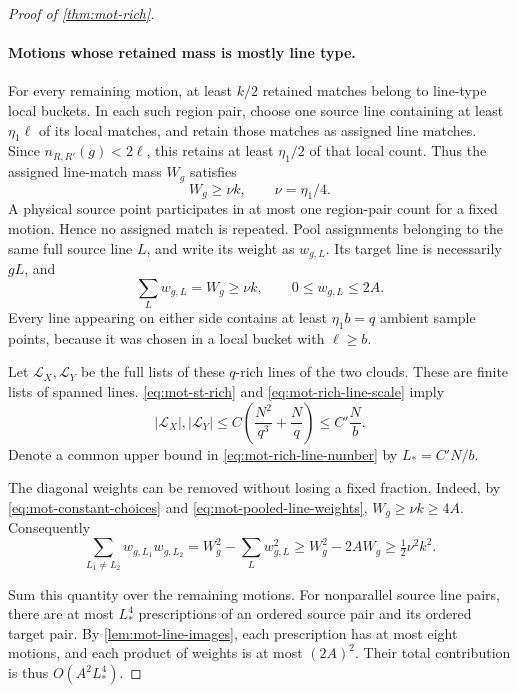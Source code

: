 \begin{proof}[Proof of \cref{thm:mot-rich}]
\paragraph{Motions whose retained mass is mostly line type.}
For every remaining motion, at least $k/2$ retained matches belong to line-type local buckets.  In each such region pair, choose one source line containing at least $\eta_1\ell$ of its local matches, and retain those matches as assigned line matches.  Since $n_{R,R'}(g)<2\ell$, this retains at least $\eta_1/2$ of that local count.  Thus the assigned line-match mass $W_g$ satisfies
\[
 W_g\ge\nu k,\qquad \nu=\eta_1/4.
\]
A physical source point participates in at most one region-pair count for a fixed motion.  Hence no assigned match is repeated. Pool assignments belonging to the same full source line $L$, and write its weight as $w_{g,L}$.  Its target line is necessarily $gL$, and
\begin{equation}
\label{eq:mot-pooled-line-weights}
 \sum_Lw_{g,L}=W_g\ge\nu k,
 \qquad 0\le w_{g,L}\le2A.
\end{equation}
Every line appearing on either side contains at least $\eta_1b=q$ ambient sample points, because it was chosen in a local bucket with $\ell\ge b$.

Let $\mathcal{L}_X,\mathcal{L}_Y$ be the full lists of these $q$-rich lines of the two clouds.  These are finite lists of spanned lines.  \eqref{eq:mot-st-rich} and \eqref{eq:mot-rich-line-scale} imply
\begin{equation}
\label{eq:mot-rich-line-number}
 |\mathcal{L}_X|,|\mathcal{L}_Y|
 \le C\left(\frac{N^2}{q^3}+\frac Nq\right)
 \le C'\frac Nb.
\end{equation}
Denote a common upper bound in \eqref{eq:mot-rich-line-number} by $L_*=C'N/b$.

The diagonal weights can be removed without losing a fixed fraction.  Indeed, by \eqref{eq:mot-constant-choices} and \eqref{eq:mot-pooled-line-weights}, $W_g\ge\nu k\ge4A$.  Consequently
\begin{equation}
\label{eq:mot-distinct-line-pair-mass}
 \sum_{L_1\ne L_2}w_{g,L_1}w_{g,L_2}
 =W_g^2-\sum_Lw_{g,L}^2
 \ge W_g^2-2AW_g
 \ge\tfrac12\nu^2 k^2.
\end{equation}

Sum this quantity over the remaining motions.  For nonparallel source line pairs, there are at most $L_*^4$ prescriptions of an ordered source pair and its ordered target pair.  By \cref{lem:mot-line-images}, each prescription has at most eight motions, and each product of weights is at most $(2A)^2$. Their total contribution is thus $O(A^2L_*^4)$.


\end{proof}
